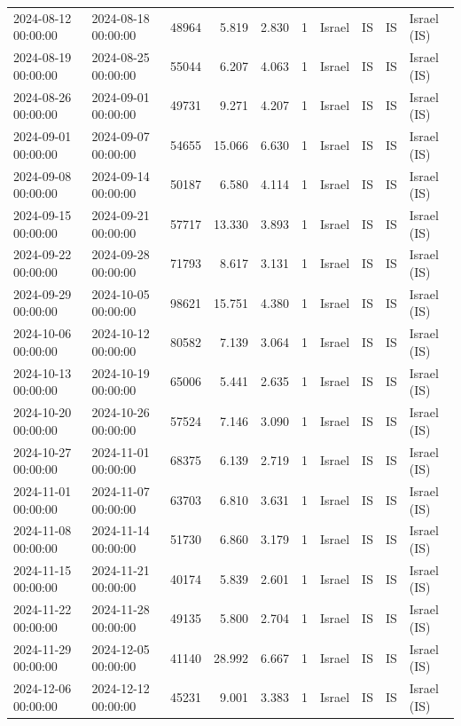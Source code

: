 \begin{tabular}{llrrrlllll}
2024-08-12 00:00:00 & 2024-08-18 00:00:00 & 48964 & 5.819 & 2.830 & 1 & Israel & IS & IS & Israel (IS) \\
2024-08-19 00:00:00 & 2024-08-25 00:00:00 & 55044 & 6.207 & 4.063 & 1 & Israel & IS & IS & Israel (IS) \\
2024-08-26 00:00:00 & 2024-09-01 00:00:00 & 49731 & 9.271 & 4.207 & 1 & Israel & IS & IS & Israel (IS) \\
2024-09-01 00:00:00 & 2024-09-07 00:00:00 & 54655 & 15.066 & 6.630 & 1 & Israel & IS & IS & Israel (IS) \\
2024-09-08 00:00:00 & 2024-09-14 00:00:00 & 50187 & 6.580 & 4.114 & 1 & Israel & IS & IS & Israel (IS) \\
2024-09-15 00:00:00 & 2024-09-21 00:00:00 & 57717 & 13.330 & 3.893 & 1 & Israel & IS & IS & Israel (IS) \\
2024-09-22 00:00:00 & 2024-09-28 00:00:00 & 71793 & 8.617 & 3.131 & 1 & Israel & IS & IS & Israel (IS) \\
2024-09-29 00:00:00 & 2024-10-05 00:00:00 & 98621 & 15.751 & 4.380 & 1 & Israel & IS & IS & Israel (IS) \\
2024-10-06 00:00:00 & 2024-10-12 00:00:00 & 80582 & 7.139 & 3.064 & 1 & Israel & IS & IS & Israel (IS) \\
2024-10-13 00:00:00 & 2024-10-19 00:00:00 & 65006 & 5.441 & 2.635 & 1 & Israel & IS & IS & Israel (IS) \\
2024-10-20 00:00:00 & 2024-10-26 00:00:00 & 57524 & 7.146 & 3.090 & 1 & Israel & IS & IS & Israel (IS) \\
2024-10-27 00:00:00 & 2024-11-01 00:00:00 & 68375 & 6.139 & 2.719 & 1 & Israel & IS & IS & Israel (IS) \\
2024-11-01 00:00:00 & 2024-11-07 00:00:00 & 63703 & 6.810 & 3.631 & 1 & Israel & IS & IS & Israel (IS) \\
2024-11-08 00:00:00 & 2024-11-14 00:00:00 & 51730 & 6.860 & 3.179 & 1 & Israel & IS & IS & Israel (IS) \\
2024-11-15 00:00:00 & 2024-11-21 00:00:00 & 40174 & 5.839 & 2.601 & 1 & Israel & IS & IS & Israel (IS) \\
2024-11-22 00:00:00 & 2024-11-28 00:00:00 & 49135 & 5.800 & 2.704 & 1 & Israel & IS & IS & Israel (IS) \\
2024-11-29 00:00:00 & 2024-12-05 00:00:00 & 41140 & 28.992 & 6.667 & 1 & Israel & IS & IS & Israel (IS) \\
2024-12-06 00:00:00 & 2024-12-12 00:00:00 & 45231 & 9.001 & 3.383 & 1 & Israel & IS & IS & Israel (IS) \\

\end{tabular}
